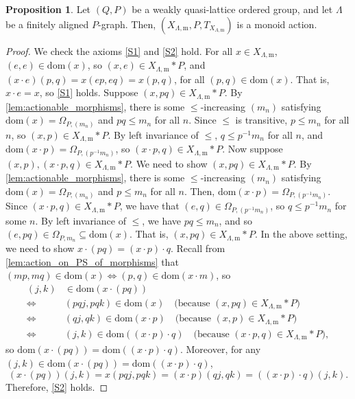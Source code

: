 \documentclass[11pt]{amsart}
\theoremstyle{definition}
\numberwithin{thm}{section}
\numberwithin{equation}{section}
\newtheorem{proposition}[thm]{Proposition}
\newcommand{\morphdom}[1]{\mathrm{dom}(#1)}
\newcommand{\M}{\mathrm{m}}
\newcommand{\PS}[2]{X_{#2, #1}}
\newcommand{\RPA}[2]{#1 \cdot #2}
\begin{document}
\begin{proposition}
Let $(Q, P)$ be a weakly quasi-lattice ordered group, and let $\Lambda$ be a finitely aligned $P$-graph.
Then, $(\PS{\M}{\Lambda}, P, T_{\PS{\M}{\Lambda}})$ is a monoid action.
\end{proposition}
\begin{proof}
We check the axioms \ref{S1} and \ref{S2} hold.
For all $x \in \PS{\M}{\Lambda}$, $(e, e) \in \morphdom{x}$, so $(x, e) \in \PS{\M}{\Lambda} * P$, and $(\RPA{x}{e})(p, q) = x(ep, eq) = x(p, q)$, for all $(p, q) \in \morphdom{x}$. 
That is, $\RPA{x}{e} = x$, so \ref{S1} holds.
Suppose $(x, pq) \in \PS{\M}{\Lambda} * P$. 
By \cref{lem:actionable_morphisms}, there is some $\leq$-increasing $(m_n)$ satisfying $\morphdom{x} = \Omega_{P, (m_n)}$ and $pq \leq m_n$ for all $n$.
Since $\leq$ is transitive, $p \leq m_n$ for all $n$, so $(x, p) \in \PS{\M}{\Lambda} * P$.
By left invariance of $\leq$, $q \leq p^{-1}m_n$ for all $n$, and $\morphdom{\RPA{x}{p}} = \Omega_{P, (p^{-1}m_n)}$, so $(\RPA{x}{p}, q) \in \PS{\M}{\Lambda} * P$.
Now suppose $(x, p), (\RPA{x}{p}, q) \in \PS{\M}{\Lambda} * P$.
We need to show $(x, pq) \in \PS{\M}{\Lambda} * P$.
By \cref{lem:actionable_morphisms}, there is some $\leq$-increasing $(m_n)$ satisfying $\morphdom{x} = \Omega_{P, (m_n)}$ and $p \leq m_n$ for all $n$.
Then, $\morphdom{\RPA{x}{p}} = \Omega_{P, (p^{-1}m_n)}$.
Since $(\RPA{x}{p}, q) \in \PS{\M}{\Lambda} * P$, we have that $(e, q) \in \Omega_{P, (p^{-1}m_n)}$, so $q \leq p^{-1}m_n$ for some $n$. 
By left invariance of $\leq$, we have $pq \leq m_n$, and so $(e, pq) \in \Omega_{P, m_n} \subseteq \morphdom{x}$. 
That is, $(x, pq) \in \PS{\M}{\Lambda} * P$.
In the above setting, we need to show $\RPA{x}{(pq)} = \RPA{(\RPA{x}{p})}{q}$.
Recall from \cref{lem:action_on_PS_of_morphisms} that $(mp, mq) \in \morphdom{x} \iff (p, q) \in \morphdom{\RPA{x}{m}}$, so 
\begin{align*}
(j, k)& \in \morphdom{\RPA{x}{(pq)}} \\
\iff &(pqj, pqk) \in \morphdom{x} \quad \text{(because $(x, pq) \in 
\PS{\M}{\Lambda} * P$)} \\
\iff &(qj, qk) \in \morphdom{\RPA{x}{p}} \quad \text{(because $(x, p) 
\in \PS{\M}{\Lambda} * P$)} \\
\iff &(j, k) \in \morphdom{\RPA{(\RPA{x}{p})}{q}} \quad 
\text{(because $(\RPA{x}{p}, q) \in \PS{\M}{\Lambda} * P$)},
\end{align*}
so $\morphdom{\RPA{x}{(pq)}} = \morphdom{\RPA{(\RPA{x}{p})}{q}}$. 
Moreover, for any $(j, k) \in \morphdom{\RPA{x}{(pq)}} = \morphdom{\RPA{(\RPA{x}{p})}{q}}$, 
\[
(\RPA{x}{(pq)})(j, k)
= x(pqj, pqk)
= (\RPA{x}{p})(qj, qk)
= (\RPA{(\RPA{x}{p})}{q})(j, k).
\]
Therefore, \ref{S2} holds.
\end{proof}
\end{document}
